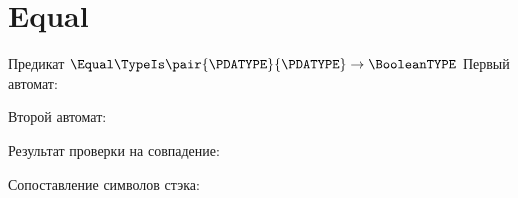 \section{Equal}
\begin{frame}{Предикат $\Equal\TypeIs\pair{\PDATYPE}{\PDATYPE}\to\BooleanTYPE$}
	Первый автомат:


	Второй автомат:


	Результат проверки на совпадение:

	Сопоставление символов стэка:

\end{frame}
